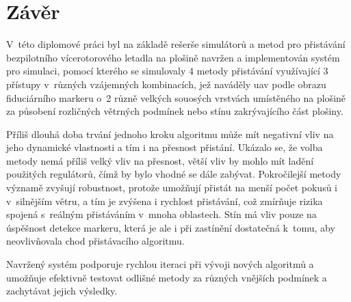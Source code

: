 \chapter{Závěr} \label{chap:conclusion}

V~této diplomové práci byl na základě rešerše simulátorů a metod pro přistávání bezpilotního vícerotorového letadla na plošině navržen a implementován systém pro simulaci, pomocí kterého se simulovaly 4 metody přistávání využívající 3 přístupy v~různých vzájemných kombinacích, jež naváděly \acrshort{uav} podle obrazu fiduciárního markeru o~2 různě velkých souosých vrstvách umístěného na plošině za působení rozličných větrných podmínek nebo stínu zakrývajícího část plošiny. 

Příliš dlouhá doba trvání jednoho kroku algoritmu může mít negativní vliv na jeho dynamické vlastnosti a tím i na přesnost přistání. Ukázalo se, že volba metody nemá příliš velký vliv na přesnost, větší vliv by mohlo mít ladění použitých regulátorů, čímž by bylo vhodné se dále zabývat. Pokročilejší metody významě zvyšují robustnost, protože umožňují přistát na menší počet pokusů i v~silnějším větru, a tím je zvýšena i rychlost přistávání, což zmírňuje rizika spojená s~reálným přistáváním v~mnoha oblastech. Stín má %
vliv pouze na úspěšnost detekce markeru, která je ale i při zastínění dostatečná k~tomu, aby neovlivňovala chod přistávacího algoritmu.

Navržený systém podporuje rychlou iteraci při vývoji nových algoritmů a umožňuje efektivně testovat odlišné metody za různých vnějších podmínek a zachytávat jejich výsledky.